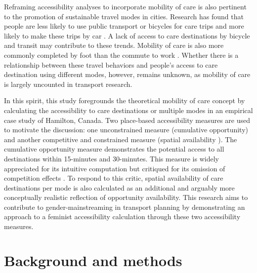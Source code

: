 \documentclass[
  authoryear,
  preprint,
  3p]{elsarticle}
\begin{document}
Reframing accessibility analyses to incorporate mobility of care is also
pertinent to the promotion of sustainable travel modes in cities.
Research has found that people are less likely to use public transport
or bicycles for care trips
\citep{ravensbergenExploratoryAnalysisMobility2022} and more likely to
make these trips by car
\citep{maciejewskaHaveChildrenThus2019, ravensbergenExploratoryAnalysisMobility2022}.
A lack of access to care destinations by bicycle and transit may
contribute to these trends. Mobility of care is also more commonly
completed by foot than the commute to work
\citep{ravensbergenExploratoryAnalysisMobility2022}. Whether there is a
relationship between these travel behaviors and people's access to care
destination using different modes, however, remains unknown, as mobility
of care is largely uncounted in transport research.

In this spirit, this study foregrounds the theoretical mobility of care
concept by calculating the accessibility to care destinations or
multiple modes in an empirical case study of Hamilton, Canada. Two
place-based accessibility measures are used to motivate the discussion:
one unconstrained measure (cumulative opportunity) and another
competitive and constrained measure (spatial availability
\citep{soukhovIntroducingSpatialAvailability2023}). The cumulative
opportunity measure demonstrates the potential access to all
destinations within 15-minutes and 30-minutes. This measure is widely
appreciated for its intuitive computation
\citep{handyAccessibilityIdeaWhose2020, handyMeasuringAccessibilityExploration1997, kelobonyeRelativeAccessibilityAnalysis2019, chengInvestigatingWalkingAccessibility2019}
but critiqued for its omission of competition effects
\citep{paezDemand2019, soukhovIntroducingSpatialAvailability2023, kelobonyeMeasuringAccessibilitySpatial2020, merlinDoesCompetitionMatter2017}.
To respond to this critic, spatial availability of care destinations per
mode is also calculated as an additional and arguably more conceptually
realistic reflection of opportunity availability. This research aims to
contribute to gender-mainstreaming in transport planning by
demonstrating an approach to a feminist accessibility calculation
through these two accessibility measures.

\hypertarget{background-and-methods}{%
\section{Background and methods}\label{background-and-methods}}
\end{document}
